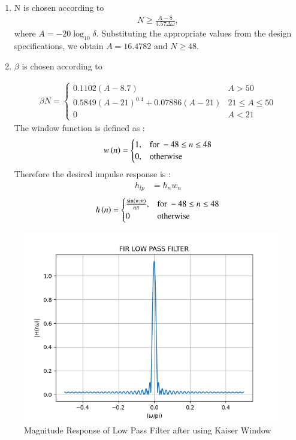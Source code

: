 \documentclass{article}
\begin{document}
\begin{enumerate}
\item  N is chosen according to
\begin{align}
    N \geq \frac{A-8}{4.57\Delta \omega},
\end{align}
where $A = -20\log_{10}\delta$.  Substituting the appropriate values from the design specifications, we obtain
$A = 16.4782$ and $N \geq 48$.


\item  $\beta$ is chosen according to

\begin{align}
    \beta N = \left\{ \begin{array}{ll} 0.1102(A-8.7) & A > 50 \\
0.5849(A-21)^{0.4}+ 0.07886(A-21) & 21 \leq A \leq 50 \\
0 & A < 21\end{array} \right.
\end{align}
The window function is defined as :
\begin{align}
    w\left(n\right) = 
\begin{cases} 
    1, & \text{for } -48\leq n \leq 48 \\
    0, & \text{otherwise } 
\end{cases} \label{eq:w(n)_for_Kaiser}
\end{align}
Therefore the desired impulse response is :
\begin{align}
    h_{lp} &= h_{n}w_{n}
\end{align}
\begin{align}
    h\left(n\right) = 
\begin{cases} 
    \frac{\sin(w_l n)}{n\pi},  & \text{for } -48\leq n \leq 48 \\
    0 &\text{otherwise}
\end{cases} \label{eq:h(n)desired_for_LPF}
\end{align}
\end{enumerate}
\begin{figure}[H]
\centering
\includegraphics[width=1\columnwidth]{figs/7.png}
\caption{Magnitude Response of Low Pass Filter after using Kaiser Window}
\label{fig:Kaiser_LPF_response}
\end{figure}
\end{document}
